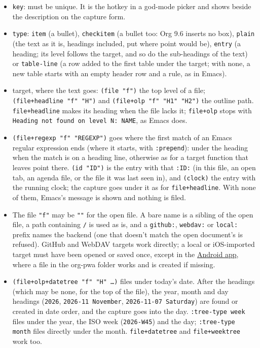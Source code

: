 \documentclass[11pt]{article}
\begin{document}
\begin{itemize}
\item \texttt{key}: must be unique. It is the hotkey in a god-mode picker and shows beside the description on the capture form.
\item \texttt{type}: \texttt{item} (a bullet), \texttt{checkitem} (a bullet too: Org 9.6 inserts no box), \texttt{plain} (the text as it is, headings included, put where point would be), \texttt{entry} (a heading; its level follows the target, and so do the sub-headings of the text) or \texttt{table-line} (a row added to the first table under the target; with none, a new table starts with an empty header row and a rule, as in Emacs).
\item target, where the text goes: \texttt{(file "f")} the top level of a file; \texttt{(file+headline "f" "H")} and \texttt{(file+olp "f" "H1" "H2")} the outline path. \texttt{file+headline} makes its heading when the file lacks it; \texttt{file+olp} stops with \texttt{Heading not found on level N: NAME}, as Emacs does.
\item \texttt{(file+regexp "f" "REGEXP")} goes where the first match of an Emacs regular expression ends (where it starts, with \texttt{:prepend}): under the heading when the match is on a heading line, otherwise as for a target function that leaves point there. \texttt{(id "ID")} is the entry with that \texttt{:ID:} (in this file, an open tab, an agenda file, or the file it was last seen in), and \texttt{(clock)} the entry with the running clock; the capture goes under it as for \texttt{file+headline}. With none of them, Emacs's message is shown and nothing is filed.
\item The file \texttt{"f"} may be \texttt{""} for the open file. A bare name is a sibling of the open file, a path containing \texttt{/} is used as is, and a \texttt{github:}, \texttt{webdav:} or \texttt{local:} prefix names the backend (one that doesn't match the open document's is refused). GitHub and WebDAV targets work directly; a local or iOS-imported target must have been opened or saved once, except in the \hyperref[sec:org5b8e0d4]{Android app}, where a file in the org-pwa folder works and is created if missing.
\item \texttt{(file+olp+datetree "f" "H" …)} files under today's date. After the headings (which may be none, for the top of the file), the year, month and day headings (\texttt{2026}, \texttt{2026-11 November}, \texttt{2026-11-07 Saturday}) are found or created in date order, and the capture goes into the day. \texttt{:tree-type week} files under the year, the ISO week (\texttt{2026-W45}) and the day; \texttt{:tree-type month} files directly under the month. \texttt{file+datetree} and \texttt{file+weektree} work too.

\end{itemize}
\end{document}
